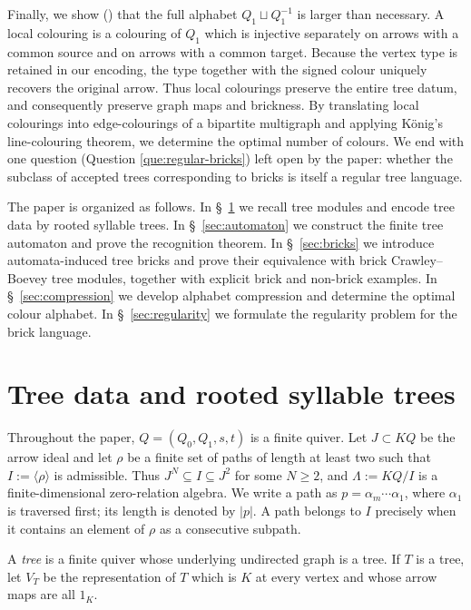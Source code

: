 \documentclass[11pt,a4paper]{amsart}
\theoremstyle{definition}
\theoremstyle{plain}
\theoremstyle{remark}
\numberwithin{equation}{section}
\begin{document}
Finally, we show () that the full alphabet $Q_1\sqcup Q_1^{-1}$ is larger than necessary. A local colouring is a colouring of $Q_1$ which is injective separately on arrows with a common source and on arrows with a common target. Because the vertex type is retained in our encoding, the type together with the signed colour uniquely recovers the original arrow. Thus local colourings preserve the entire tree datum, and consequently preserve graph maps and brickness. By translating local colourings into edge-colourings of a bipartite multigraph and applying K\"onig's line-colouring theorem, we determine the optimal number of colours. We end with one question (Question \ref{que:regular-bricks}) left open by the paper: whether the subclass of accepted trees corresponding to bricks is itself a regular tree language.

The paper is organized as follows. In \S~\ref{sec:tree-data} we recall tree modules and encode tree data by rooted syllable trees. In \S~\ref{sec:automaton} we construct the finite tree automaton and prove the recognition theorem. In  \S~\ref{sec:bricks} we introduce automata-induced tree bricks and prove their equivalence with brick Crawley--Boevey tree modules, together with explicit brick and non-brick examples. In \S~\ref{sec:compression} we develop alphabet compression and determine the optimal colour alphabet. In \S~\ref{sec:regularity} we formulate the regularity problem for the brick language.

\section{Tree data and rooted syllable trees}
\label{sec:tree-data}

Throughout the paper, $Q=(Q_0,Q_1,s,t)$ is a finite quiver. Let $J\subset KQ$ be the arrow ideal and let $\rho$ be a finite set of paths of length at least two such that $I:=\langle\rho\rangle$ is admissible. Thus $J^N\subseteq I\subseteq J^2$ for some $N\geq 2$, and $\Lambda:=KQ/I$ is a finite-dimensional zero-relation algebra. We write a path as $p=\alpha_m\cdots\alpha_1$, where $\alpha_1$ is traversed first; its length is denoted by $|p|$. A path belongs to $I$ precisely when it contains an element of $\rho$ as a consecutive subpath.

A \emph{tree} is a finite quiver whose underlying undirected graph is a tree. If $T$ is a tree, let $V_T$ be the representation of $T$ which is $K$ at every vertex and whose arrow maps are all $1_K$.
\end{document}
